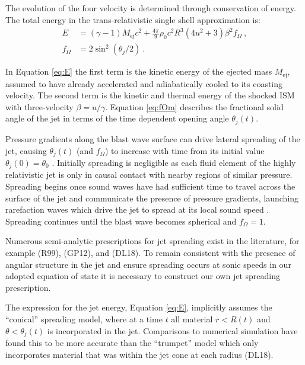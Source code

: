 \documentclass[twocolumn]{aastex62}
\newcommand{\Mej}{\ensuremath{M_{\mathrm{ej}}}}
\begin{document}
 The evolution of the four velocity is determined through conservation of energy.  The total energy in the trans-relativistic single shell approximation is:
\begin{align}
	E &= (\gamma - 1)\Mej c^2 + \frac{4\pi}{9} \rho_0 c^2 R^3 (4 u^2 + 3) \beta^2 f_\Omega \ , \label{eq:E} \\
	f_\Omega &= 2 \sin^2\left( \theta_j / 2 \right)\ . \label{eq:fOm}
\end{align}

In Equation \eqref{eq:E} the first term is the kinetic energy of the ejected mass $\Mej$, assumed to have already accelerated and adiabatically cooled to its coasting velocity. The second term is the kinetic and thermal energy of the shocked ISM with three-velocity $\beta = u / \gamma$.  Equation \eqref{eq:fOm} describes the fractional solid angle of the jet in terms of the time dependent opening angle $\theta_j(t)$. 

Pressure gradients along the blast wave surface can drive lateral spreading of the jet, causing $\theta_j(t)$ (and $f_\Omega$) to increase with time  from its initial value $\theta_j(0) = \theta_0$ \citep{Rhoads:1999aa}.  Initially spreading is negligible as each fluid element of the highly relativistic jet is only in causal contact with nearby regions of similar pressure.  Spreading begins once sound waves have had sufficient time to travel across the surface of the jet and communicate the presence of pressure gradients, launching rarefaction waves which drive the jet to spread at its local sound speed \citep{Rhoads:1999aa, van-Eerten:2012aa, Duffell:2018aa}.  Spreading continues until the blast wave becomes spherical and $f_\Omega = 1$.

Numerous semi-analytic prescriptions for jet spreading exist in the literature, for example \citet{Rhoads:1999aa} (R99), \citet{Granot:2012aa} (GP12), and \citet{Duffell:2018aa} (DL18).  To remain consistent with the presence of angular structure in the jet and ensure spreading occurs at sonic speeds in our adopted equation of state it is necessary to construct our own jet spreading prescription.  

The expression for the jet energy, Equation \eqref{eq:E}, implicitly assumes the ``conical'' spreading model, where at a time $t$ all material $r < R(t)$ and $\theta < \theta_j(t)$ is incorporated in the jet.  Comparisons to numerical simulation have found this to be more accurate than the ``trumpet'' model which only incorporates material that was within the jet cone at each radius (DL18).
\end{document}
